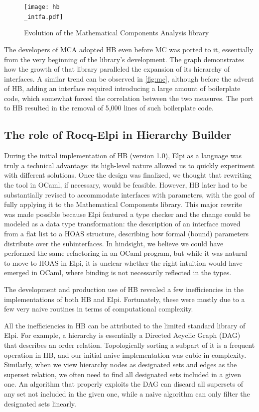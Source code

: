 \documentclass{these-ISSS}
\begin{document}
\begin{figure}[!hb]
\texttt{[image: hb\\\_intfa.pdf]}
\caption{Evolution of the Mathematical Components Analysis library\label{fig:mca}}
\end{figure}


The developers of MCA adopted HB even before MC was ported to it, essentially
from the very beginning of the library's development. The graph demonstrates
how the growth of that library paralleled the expansion of its hierarchy of
interfaces. A similar trend can be observed in \cref{fig:mc}, although before
the advent of HB, adding an interface required introducing a large amount of
boilerplate code, which somewhat forced the correlation between the two
measures. The port to HB resulted in the removal of 5,000 lines of such
boilerplate code.

\subsection{The role of Rocq-Elpi in Hierarchy Builder}

During the initial implementation of HB (version 1.0), Elpi as a language was
truly a technical advantage: its high-level nature allowed us to quickly
experiment with different solutions. Once the design was finalized, we thought
that rewriting the tool in OCaml, if necessary, would be feasible. However, HB
later had to be substantially revised to accommodate interfaces with
parameters, with the goal of fully applying it to the Mathematical Components
library. This major rewrite was made possible because Elpi featured a type
checker and the change could be modeled as a data type transformation: the
description of an interface moved from a flat list to a HOAS structure,
describing how formal (bound) parameters distribute over the subinterfaces. In
hindsight, we believe we could have performed the same refactoring in an OCaml
program, but while it was natural to move to HOAS in Elpi, it is unclear
whether the right intuition would have emerged in OCaml, where binding is not
necessarily reflected in the types.


The development and production use of HB revealed a few inefficiencies in the
implementations of both HB and Elpi. Fortunately, these were mostly due to a
few very naive routines in terms of computational complexity.

All the inefficiencies in HB can be attributed to the limited standard library
of Elpi. For example, a hierarchy is essentially a Directed Acyclic Graph
(DAG) that describes an order relation. Topologically sorting a subpart of it
is a frequent operation in HB, and our initial naive implementation was cubic
in complexity. Similarly, when we view hierarchy nodes as designated sets and
edges as the superset relation, we often need to find all designated sets
included in a given one. An algorithm that properly exploits the DAG can
discard all supersets of any set not included in the given one, while a naive
algorithm can only filter the designated sets linearly.
\end{document}

